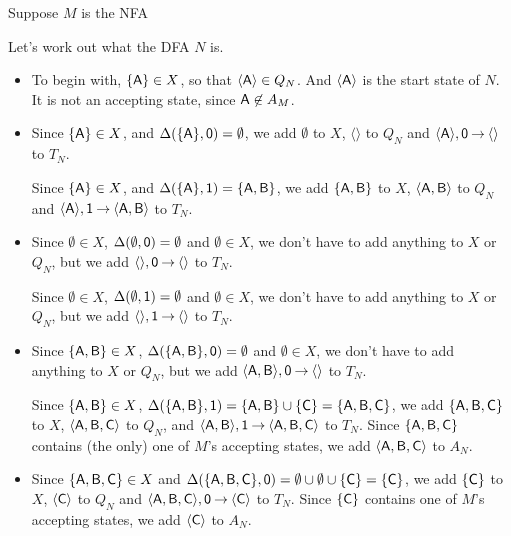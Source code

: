 Suppose $M$ is the NFA
\begin{center}

\end{center}
Let's work out what the DFA $N$ is.
\begin{itemize}
\item To begin with, $\{\mathsf{A}\}\in X$, so that $\langle\mathsf{A}\rangle\in
  Q_N$.  And $\langle\mathsf{A}\rangle$ is the start state of $N$.  It is
  not an accepting state, since $\mathsf{A}\not\in A_M$.

\item Since $\{\mathsf{A}\}\in X$, and $\Delta(\{\mathsf{A}\},\mathsf{0})=\emptyset$,
  we add $\emptyset$ to $X$, $\langle\rangle$ to $Q_N$ and
  $\langle\mathsf{A}\rangle,\mathsf{0}\mathbin{\to}\langle\rangle$ to $T_N$.

  Since $\{\mathsf{A}\}\in X$, and $\Delta(\{\mathsf{A}\},\mathsf{1})=\{\mathsf{A},\mathsf{B}\}$,
  we add $\{\mathsf{A},\mathsf{B}\}$ to $X$, $\langle\mathsf{A},\mathsf{B}\rangle$ to $Q_N$
  and $\langle\mathsf{A}\rangle,\mathsf{1}\mathbin{\to}\langle\mathsf{A},\mathsf{B}\rangle$ to $T_N$.

\item Since $\emptyset\in X$, $\Delta(\emptyset,\mathsf{0})=\emptyset$
  and $\emptyset\in X$, we don't have to add anything to $X$ or $Q_N$,
  but we add $\langle\rangle,\mathsf{0}\mathbin{\to}\langle\rangle$ to $T_N$.

  Since $\emptyset\in X$, $\Delta(\emptyset,\mathsf{1})=\emptyset$ and
  $\emptyset\in X$, we don't have to add anything to $X$ or $Q_N$, but
  we add $\langle\rangle,\mathsf{1}\mathbin{\to}\langle\rangle$ to $T_N$.

\item Since $\{\mathsf{A},\mathsf{B}\}\in X$,
  $\Delta(\{\mathsf{A},\mathsf{B}\},\mathsf{0})=\emptyset$ and $\emptyset\in X$, we
  don't have to add anything to $X$ or $Q_N$, but we add
  $\langle\mathsf{A},\mathsf{B}\rangle,\mathsf{0}\mathbin{\to}\langle\rangle$ to $T_N$.

  Since $\{\mathsf{A},\mathsf{B}\}\in X$,
  $\Delta(\{\mathsf{A},\mathsf{B}\},\mathsf{1})=\{\mathsf{A},\mathsf{B}\}\cup\{\mathsf{C}\}=
  \{\mathsf{A},\mathsf{B},\mathsf{C}\}$, we add $\{\mathsf{A},\mathsf{B},\mathsf{C}\}$ to $X$,
  $\langle\mathsf{A},\mathsf{B},\mathsf{C}\rangle$ to $Q_N$, and
  $\langle\mathsf{A},\mathsf{B}\rangle,\mathsf{1}\mathbin{\to}\langle\mathsf{A},\mathsf{B},\mathsf{C}\rangle$ to
  $T_N$.  Since $\{\mathsf{A},\mathsf{B},\mathsf{C}\}$ contains (the only) one of $M$'s
  accepting states, we add $\langle\mathsf{A},\mathsf{B},\mathsf{C}\rangle$ to $A_N$.

\item Since $\{\mathsf{A},\mathsf{B},\mathsf{C}\}\in X$ and
  $\Delta(\{\mathsf{A},\mathsf{B},\mathsf{C}\},\mathsf{0})=\emptyset\cup\emptyset\cup\{\mathsf{C}\}=
  \{\mathsf{C}\}$, we add $\{\mathsf{C}\}$ to $X$, $\langle\mathsf{C}\rangle$ to $Q_N$
  and $\langle\mathsf{A},\mathsf{B},\mathsf{C}\rangle,\mathsf{0}\mathbin{\to}\langle\mathsf{C}\rangle$ to
  $T_N$.  Since $\{\mathsf{C}\}$ contains one of $M$'s accepting states, we
  add $\langle\mathsf{C}\rangle$ to $A_N$.


\end{itemize}
